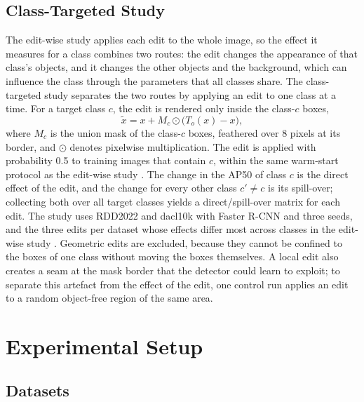 \subsection{Class-Targeted Study}
\label{sec:measure_targeted}

The edit-wise study applies each edit to the whole image, so the effect it measures for a class combines two routes: the edit changes the appearance of that class's objects, and it changes the other objects and the background, which can influence the class through the parameters that all classes share. The class-targeted study separates the two routes by applying an edit to one class at a time. For a target class $c$, the edit is rendered only inside the class-$c$ boxes,
\begin{equation}
\tilde x=x+M_c\odot\bigl(T_o(x)-x\bigr),
\label{eq:targeted}
\end{equation}
where $M_c$ is the union mask of the class-$c$ boxes, feathered over 8 pixels at its border, and $\odot$ denotes pixelwise multiplication. The edit is applied with probability 0.5 to training images that contain $c$, within the same warm-start protocol as the edit-wise study . The change in the AP50 of class $c$ is the direct effect of the edit, and the change for every other class $c'\neq c$ is its spill-over; collecting both over all target classes yields a direct/spill-over matrix for each edit. The study uses RDD2022 and dacl10k with Faster R-CNN and three seeds, and the three edits per dataset whose effects differ most across classes in the edit-wise study . Geometric edits are excluded, because they cannot be confined to the boxes of one class without moving the boxes themselves. A local edit also creates a seam at the mask border that the detector could learn to exploit; to separate this artefact from the effect of the edit, one control run applies an edit to a random object-free region of the same area.

\section{Experimental Setup}
\label{sec:setup}

\subsection{Datasets}
\label{sec:setup_data}

